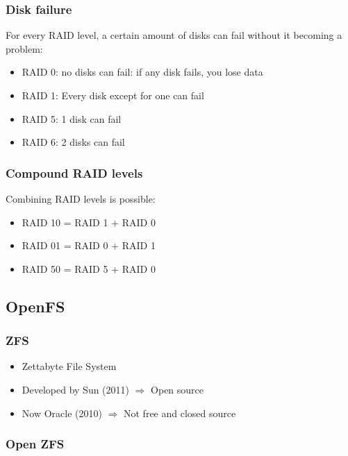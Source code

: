 \documentclass{article}
\begin{document}
\subsubsection{Disk failure}

For every RAID level, a certain amount of disks can fail without it becoming a problem:

\begin{itemize}
    \item RAID 0: no disks can fail: if any disk fails, you lose data
    \item RAID 1: Every disk except for one can fail
    \item RAID 5: 1 disk can fail
    \item RAID 6: 2 disks can fail
\end{itemize}

\subsubsection{Compound RAID levels}

Combining RAID levels is possible:

\begin{itemize}
    \item RAID 10 = RAID 1 + RAID 0
    \item RAID 01 = RAID 0 + RAID 1
    \item RAID 50 = RAID 5 + RAID 0
\end{itemize}

\subsection{OpenFS}

\subsubsection{ZFS}

\begin{itemize}
    \item Zettabyte File System
    \item Developed by Sun (2011) $\Rightarrow$ Open source
    \item Now Oracle (2010) $\Rightarrow$ Not free and closed source
\end{itemize}

\subsubsection{Open ZFS}
\end{document}
